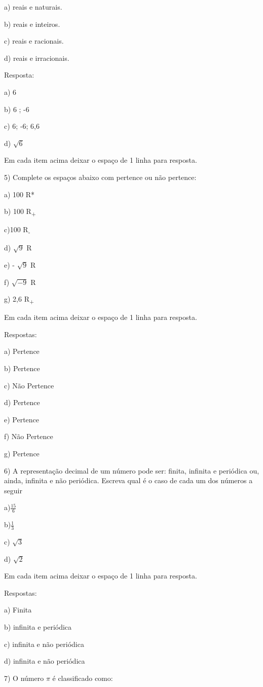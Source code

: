 {a) reais e naturais.

b) reais e inteiros.

c) reais e racionais.

d) reais e irracionais.

Resposta:

a) 6

b) 6 ; -6

c) 6; -6; 6,6

d) \(\sqrt{6}\)

Em cada item acima deixar o espaço de 1 linha para resposta.

5) Complete os espaços abaixo com pertence ou não pertence:

a) 100 R*

b) 100 R\textsubscript{+}

c)100 R\textsubscript{-}

d) \(\sqrt{9}\) R

e) - \(\sqrt{9}\) R

f) \(\sqrt{- 9}\) R

g) 2,6 R\textsubscript{+}

Em cada item acima deixar o espaço de 1 linha para resposta.

Respostas:

a) Pertence

b) Pertence

c) Não Pertence

d) Pertence

e) Pertence

f) Não Pertence

g) Pertence

6) A representação decimal de um número pode ser: finita, infinita e
periódica ou, ainda, infinita e não periódica. Escreva qual é o caso de
cada um dos números a seguir

a)\(\frac{15}{6}\)

b)\(\frac{1}{3}\)

c) \(\sqrt{3}\)

d) \(\sqrt{2}\)

Em cada item acima deixar o espaço de 1 linha para resposta.

Respostas:

a) Finita

b) infinita e periódica

c) infinita e não periódica

d) infinita e não periódica

7) O número \(\pi\) é classificado como:

}

